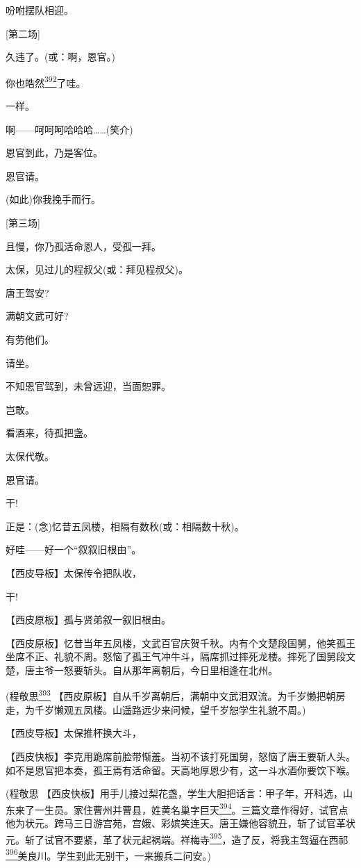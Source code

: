 吩咐摆队相迎。

{[}第二场{]}

久违了。(或：啊，恩官。)

你也皓然\protect\hyperlink{fn392}{\textsuperscript{392}}了哇。

一样。

啊------呵呵呵哈哈哈\ldots{}\ldots{}(笑介)

恩官到此，乃是客位。

恩官请。

(如此)你我挽手而行。

{[}第三场{]}

且慢，你乃孤活命恩人，受孤一拜。

太保，见过儿的程叔父(或：拜见程叔父)。

唐王驾安?

满朝文武可好?

有劳他们。

请坐。

不知恩官驾到，未曾远迎，当面恕罪。

岂敢。

看酒来，待孤把盏。

太保代敬。

恩官请。

干!

正是：(念)忆昔五凤楼，相隔有数秋(或：相隔数十秋)。

好哇------好一个``叙叙旧根由''。

【西皮导板】太保传令把队收，

干!

【西皮原板】孤与贤弟叙一叙旧根由。

【西皮原板】忆昔当年五凤楼，文武百官庆贺千秋。内有个文楚段国舅，他笑孤王坐席不正、礼貌不周。怒恼了孤王气冲牛斗，隔席抓过摔死龙楼。摔死了国舅段文楚，唐主爷一怒要斩头。自从那年离朝后，今日里相逢在北州。

(程敬思\protect\hyperlink{fn393}{\textsuperscript{393}}
【西皮原板】自从千岁离朝后，满朝中文武泪双流。为千岁懒把朝房走，为千岁懒观五凤楼。山遥路远少来问候，望千岁恕学生礼貌不周。)

【西皮导板】太保推杯换大斗，

【西皮快板】李克用跪席前脸带惭羞。当初不该打死国舅，怒恼了唐王要斩人头。如不是恩官把本奏，孤王焉有活命留。天高地厚恩少有，这一斗水酒你要饮下喉。

(程敬思
【西皮快板】用手儿接过梨花盏，学生大胆把话言：甲子年，开科选，山东来了一生员。家住曹州并曹县，姓黄名巢字巨天\protect\hyperlink{fn394}{\textsuperscript{394}}。三篇文章作得好，试官点他为状元。跨马三日游宫苑，宫娥、彩嫔笑连天。唐王嫌他容貌丑，斩了试官革状元。斩了试官不要紧，革了状元起祸端。祥梅寺\protect\hyperlink{fn395}{\textsuperscript{395}}，造了反，将我主驾逼在西祁\protect\hyperlink{fn396}{\textsuperscript{396}}美良川。学生到此无别干，一来搬兵二问安。)

